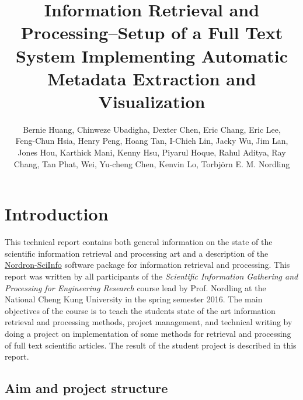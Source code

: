 \documentclass[a4paper,twocolumn,twoside]{article}
\begin{document}
 
	
	\title{Information Retrieval and Processing--Setup of a Full Text System Implementing Automatic Metadata Extraction and Visualization}
	\author{Bernie Huang, Chinweze Ubadigha, Dexter Chen, Eric Chang, Eric Lee, \\
		Feng-Chun Hsia, Henry Peng, Hoang Tan, I-Chieh Lin, Jacky Wu, Jim Lan, \\
		Jones Hou, Karthick Mani, Kenny Hsu, Piyarul Hoque, Rahul Aditya, Ray \\
		Chang, Tan Phat, Wei, Yu-cheng Chen, Kenvin Lo, Torbjörn E. M. Nordling}  %
	\maketitle   
	
	\section{Introduction}
	\label{Introduction}
	
	This technical report contains both general information on the state of the scientific information retrieval and processing art and a description of the \href{https://bitbucket.org/nordron/nordron-sciinfo}{Nordron-SciInfo} software package for information retrieval and processing. 
	This report was written by all participants of the \emph{Scientific Information Gathering and Processing for Engineering Research} course lead by Prof. Nordling at the National Cheng Kung University in the spring semester 2016.
	The main objectives of the course is to teach the students state of the art information retrieval and processing methods, project management, and technical writing by doing a project on implementation of some methods for retrieval and processing of full text scientific articles.
	The result of the student project is described in this report.
	
	\subsection{Aim and project structure}
	\label{aim}

	
\end{document}
